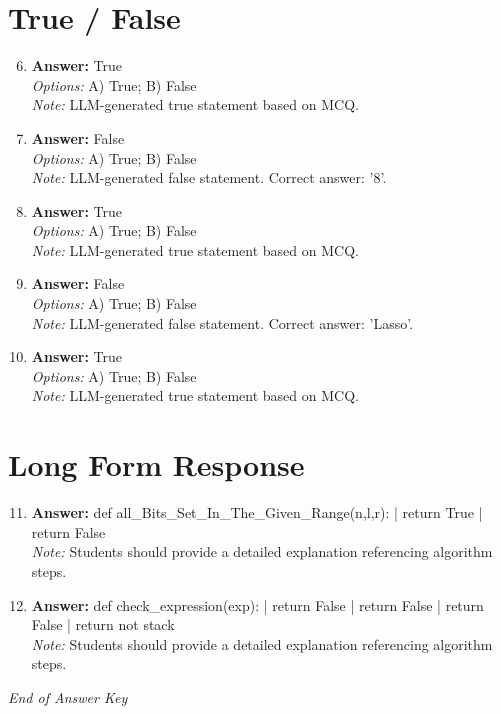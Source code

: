 \documentclass[12pt]{article}
\begin{document}
\section*{True / False}
\begin{enumerate}[label=\arabic*.]
\setcounter{enumi}{5}
\item \textbf{Answer:} True
\\ \textit{Options:} A) True; B) False
\\ \textit{Note:} LLM-generated true statement based on MCQ.
\item \textbf{Answer:} False
\\ \textit{Options:} A) True; B) False
\\ \textit{Note:} LLM-generated false statement. Correct answer: '8'.
\item \textbf{Answer:} True
\\ \textit{Options:} A) True; B) False
\\ \textit{Note:} LLM-generated true statement based on MCQ.
\item \textbf{Answer:} False
\\ \textit{Options:} A) True; B) False
\\ \textit{Note:} LLM-generated false statement. Correct answer: 'Lasso'.
\item \textbf{Answer:} True
\\ \textit{Options:} A) True; B) False
\\ \textit{Note:} LLM-generated true statement based on MCQ.
\end{enumerate}

\section*{Long Form Response}
\begin{enumerate}[label=\arabic*.]
\setcounter{enumi}{10}
\item \textbf{Answer:} def all\_Bits\_Set\_In\_The\_Given\_Range(n,l,r): | return True | return False
\\ \textit{Note:} Students should provide a detailed explanation referencing algorithm steps.
\item \textbf{Answer:} def check\_expression(exp): | return False | return False | return False | return not stack
\\ \textit{Note:} Students should provide a detailed explanation referencing algorithm steps.
\end{enumerate}

\vfill
\noindent\textit{End of Answer Key}
\end{document}
